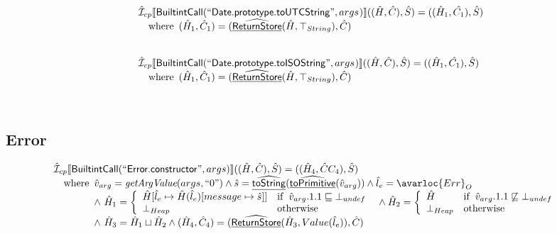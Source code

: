 \[\begin{array}{l}
\hat{\mathcal{I}} _{cp}\llbracket \mbox{\textsf{BuiltintCall}}(``\mbox{\textsf{Date.prototype.toUTCString}}",args_{})\rrbracket((\hat{H},\hat{C}), \hat{S})
  = ((\hat{H}_1, \hat{C_1}), \hat{S})\\
\quad{\rm where}\begin{array}[t]{l}
  (\hat{H}_1, \hat{C}_1) = (\widehat{\underline{\sf ReturnStore}}(\hat{H},\top_{String}), \hat{C})\\
  \end{array}\\
\\\\


\hat{\mathcal{I}} _{cp}\llbracket \mbox{\textsf{BuiltintCall}}(``\mbox{\textsf{Date.prototype.toISOString}}",args_{})\rrbracket((\hat{H},\hat{C}), \hat{S})
  = ((\hat{H}_1, \hat{C_1}), \hat{S})\\
\quad{\rm where}\begin{array}[t]{l}
  (\hat{H}_1, \hat{C}_1) = (\widehat{\underline{\sf ReturnStore}}(\hat{H},\top_{String}), \hat{C})\\
  \end{array}\\
\\\\
\end{array}
\]



\subsection{Error}
\[
\begin{array}{l}
\aI _{cp}\lbr \SF{BuiltintCall}(``\SF{Error.constructor}",args)\rbr((\hat{H},\hat{C}), \hat{S})
  = ((\hat{H}_4, \hat{C}C_4), \hat{S})\\
\quad\wherec{
  \hat{v}_{arg} = \hf{getArgValue}(args, ``0")
  \land \hat{s}= \ahf{toString}(\ahf{toPrimitive}(\hat{v}_{arg}))
  \land \hat{l}_e = \avarloc{Err}_O\\
  \land\ \hat{H}_1 = \left\{\begin{array}{ll}
      \hat{H}[\hat{l}_e \mapsto \hat{H}(\hat{l}_e)[message \mapsto \hat{s}]]
      & \ifc{\hat{v}_{arg}.1.1 \sqsubseteq \bot_{undef}}\\
      \bot_{Heap} & \owc
    \end{array}\right.
  \land \hat{H}_2 = \left\{\begin{array}{ll}
      \hat{H}
      & \ifc{\hat{v}_{arg}.1.1 \not\sqsubseteq \bot_{undef}}\\
      \bot_{Heap} & \owc
    \end{array}\right.\\
  \land\ \hat{H}_3 = \hat{H}_1 \sqcup \hat{H}_2
  \land (\hat{H}_4, \hat{C}_4) = (\ahf{ReturnStore}(\hat{H}_3, Value(\hat{l}_e)), \hat{C})\\
  }\\
\end{array}
\]

